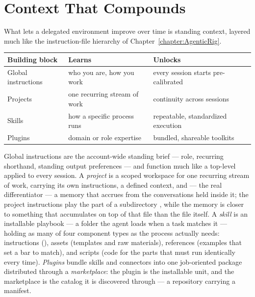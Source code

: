 \section{Context That Compounds}

What lets a delegated environment improve over time is standing context, layered much like the instruction-file hierarchy of Chapter~\ref{chapter:AgenticRig}.

\begin{center}
\small
\begin{tabular}{@{}lll@{}}
\toprule
Building block & Learns & Unlocks \\
\midrule
Global instructions & who you are, how you work   & every session starts pre-calibrated \\
Projects            & one recurring stream of work & continuity across sessions \\
Skills              & how a specific process runs  & repeatable, standardized execution \\
Plugins             & domain or role expertise     & bundled, shareable toolkits \\
\bottomrule
\end{tabular}
\end{center}

Global instructions are the account-wide standing brief --- role, recurring shorthand, standing output preferences --- and function much like a top-level  applied to every session.
A \emph{project} is a scoped workspace for one recurring stream of work, carrying its own instructions, a defined context, and --- the real differentiator --- a memory that accrues from the conversations held inside it; the project instructions play the part of a subdirectory , while the memory is closer to something that accumulates on top of that file than the file itself.
A \emph{skill} is an installable playbook --- a folder the agent loads when a task matches it --- holding as many of four component types as the process actually needs: instructions (), assets (templates and raw materials), references (examples that set a bar to match), and scripts (code for the parts that must run identically every time).
\emph{Plugins} bundle skills and connectors into one job-oriented package distributed through a \emph{marketplace}: the plugin is the installable unit, and the marketplace is the catalog it is discovered through --- a repository carrying a  manifest.

